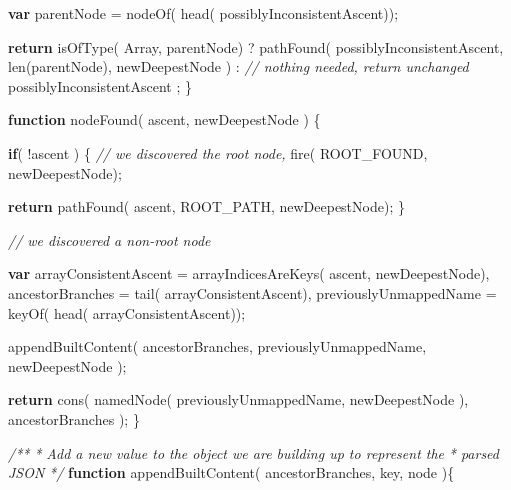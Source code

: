 \documentclass[]{article}
\newenvironment{Shaded}{}{}
\newcommand{\KeywordTok}[1]{\textcolor[rgb]{0.00,0.44,0.13}{\textbf{{#1}}}}
\newcommand{\CommentTok}[1]{\textcolor[rgb]{0.38,0.63,0.69}{\textit{{#1}}}}
\newcommand{\FunctionTok}[1]{\textcolor[rgb]{0.02,0.16,0.49}{{#1}}}
\newcommand{\NormalTok}[1]{{#1}}
\begin{document}
\begin{Shaded}
\begin{Highlighting}[]
      \KeywordTok{var} \NormalTok{parentNode = }\FunctionTok{nodeOf}\NormalTok{( }\FunctionTok{head}\NormalTok{( possiblyInconsistentAscent));}
      
      \KeywordTok{return}      \FunctionTok{isOfType}\NormalTok{( Array, parentNode)}
               \NormalTok{?}
                  \FunctionTok{pathFound}\NormalTok{(  possiblyInconsistentAscent, }
                              \FunctionTok{len}\NormalTok{(parentNode), }
                              \NormalTok{newDeepestNode}
                  \NormalTok{)}
               \NormalTok{:  }
                  \CommentTok{// nothing needed, return unchanged}
                  \NormalTok{possiblyInconsistentAscent }
               \NormalTok{;}
   \NormalTok{\}}
                 
   \KeywordTok{function} \FunctionTok{nodeFound}\NormalTok{( ascent, newDeepestNode ) \{}
      
      \KeywordTok{if}\NormalTok{( !ascent ) \{}
         \CommentTok{// we discovered the root node,}
         \FunctionTok{fire}\NormalTok{( ROOT_FOUND, newDeepestNode);}
                    
         \KeywordTok{return} \FunctionTok{pathFound}\NormalTok{( ascent, ROOT_PATH, newDeepestNode);         }
      \NormalTok{\}}

      \CommentTok{// we discovered a non-root node}
                 
      \KeywordTok{var} \NormalTok{arrayConsistentAscent  = }\FunctionTok{arrayIndicesAreKeys}\NormalTok{( ascent, newDeepestNode),      }
          \NormalTok{ancestorBranches       = }\FunctionTok{tail}\NormalTok{( arrayConsistentAscent),}
          \NormalTok{previouslyUnmappedName = }\FunctionTok{keyOf}\NormalTok{( }\FunctionTok{head}\NormalTok{( arrayConsistentAscent));}
          
      \FunctionTok{appendBuiltContent}\NormalTok{( }
         \NormalTok{ancestorBranches, }
         \NormalTok{previouslyUnmappedName, }
         \NormalTok{newDeepestNode }
      \NormalTok{);}
                                                                                                         
      \KeywordTok{return} \FunctionTok{cons}\NormalTok{( }
               \FunctionTok{namedNode}\NormalTok{( previouslyUnmappedName, newDeepestNode ), }
               \NormalTok{ancestorBranches}
      \NormalTok{);                                                                          }
   \NormalTok{\}}


   \CommentTok{/**}
\CommentTok{    * Add a new value to the object we are building up to represent the}
\CommentTok{    * parsed JSON}
\CommentTok{    */}
   \KeywordTok{function} \FunctionTok{appendBuiltContent}\NormalTok{( ancestorBranches, key, node )\{}
     

\end{Highlighting}
\end{Shaded}
\end{document}
